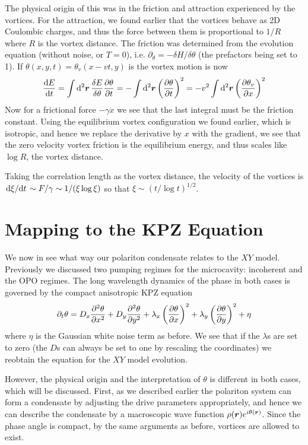 The physical origin of this was in the friction and attraction experienced by the vortices. For the attraction, we found earlier that the vortices behave as 2D Coulombic charges, and thus the force between them is proportional to $1/R$ where $R$ is the vortex distance. The friction was determined from the evolution equation (without noise, or $T=0$), i.e. $\partial_ \theta = -\delta H/ \delta 
\theta$ (the prefactors being set to 1). If $\theta(x,y,t)= \theta_v(x-vt,y)$ is the vortex motion is now
\[
\dv{E}{t} = \int \dd[2]{\boldsymbol{r}} \frac{\delta E}{\delta \theta}\pdv{\theta}{t} = - \int \dd[2]{\boldsymbol{r}} \left(\pdv{\theta}{t}  \right)^2 = -v^2 \int \dd[2]{\boldsymbol{r}} \left( \pdv{\theta_v}{x}\right)^2
\]
Now for a frictional force $-\gamma \dot{x}$ we see that the last integral must be the friction constant. Using the equilibrium vortex configuration we found earlier, which is isotropic, and hence we replace the derivative by $x$ with the gradient, we see that the zero velocity vortex friction is the equilibrium energy, and thus scales like $\log R$, the vortex distance. 

Taking the correlation length as the vortex distance, the velocity of the vortices is $\dv*{\xi}{t} \sim F/\gamma \sim 1/(\xi \log \xi)$ so that $\xi \sim (t/\log t)^{1/2}$. 

\section{Mapping to the KPZ Equation}

We now in see what way our polariton condensate relates to the $XY$ model. Previously we discussed two pumping regimes for the microcavity: incoherent and the OPO regimes. The long wavelength dynamics of the phase in both cases is governed by the compact anisotropic KPZ equation \cite{PhysRevX.7.041006}
\[
\partial_t \theta = D_x \pdv[2]{\theta}{x} + D_y \pdv[2]{\theta}{y} + \lambda_x \left(\pdv{\theta}{x}\right)^2  + \lambda_y\left( \pdv{\theta}{y}\right)^2 + \eta
\]
where $\eta$ is the Gaussian white noise term as before. We see that if the $\lambda$s are set to zero (the $D$s can always be set to one by rescaling the coordinates) we reobtain the equation for the $XY$ model evolution.

However, the physical origin and the interpretation of $\theta$ is different in both cases, which will be discussed. First, as we described earlier the polariton system can form a condensate by adjusting the drive parameters appropriately, and hence we can describe the condensate by a macroscopic wave function $\rho(\boldsymbol{r})e^{i \theta(\boldsymbol{r})}$. Since the phase angle is compact, by the same arguments as before, vortices are allowed to exist. 

